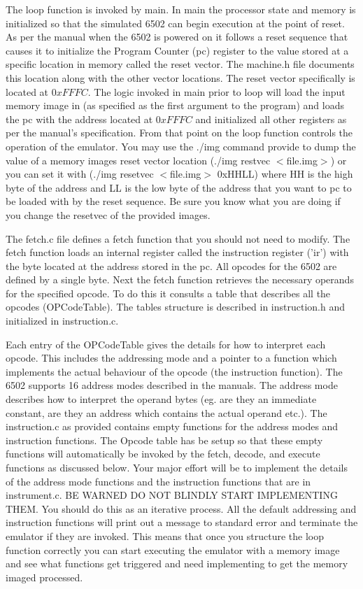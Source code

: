 \documentclass[11pt]{article}
\begin{document}
{The loop function is invoked by main.  In main the processor state and
memory is initialized so that the simulated 6502 can begin execution at
the point of reset.  As per the manual when the 6502 is powered on it
follows a reset sequence that causes it to initialize the Program
Counter (pc) register to the
value stored at a specific location in memory called the reset
vector.  The machine.h file documents this location along with the other vector
locations.  The reset vector specifically is located at $0xFFFC$.  The
logic invoked in main prior to loop will load the input memory image
in (as specified as the first argument to the program) and loads
the pc with the address located at $0xFFFC$ and initialized all other
registers as per the manual's specification.  From that point on the
loop function controls the operation of the emulator.  You may use the
./img command provide to dump the value of a memory images reset
vector location (./img restvec $<$file.img$>$) or you can set it with
(./img resetvec $<$file.img$>$ 0xHHLL) where HH is the high byte of the
address and LL is the low byte of the address that you want to pc to
be loaded with by the reset sequence.  Be sure you know what you are
doing if you change the resetvec of the provided images.

The fetch.c file defines a fetch function that you should not need to
modify.  The fetch function loads an internal
register called the instruction register ('ir') with the byte located
at the address stored in the pc.  All opcodes for the 6502 are defined
by a single byte.  Next the fetch function
retrieves the necessary operands for the specified opcode.  To do this
it consults a table that describes all the opcodes (OPCodeTable). The
tables structure is described in instruction.h and initialized in
instruction.c.  

Each entry of the OPCodeTable gives the details for how to interpret
each opcode.  This includes the addressing mode and a pointer to a
function which implements the actual behaviour of the opcode (the
instruction function). The 6502 supports 16 address modes described in
the manuals.  The address mode describes how to interpret the operand
bytes (eg. are they an immediate constant, are they an address which
contains the actual operand etc.).  The instruction.c as provided contains empty
functions for the address modes and instruction functions.  The Opcode
table has be setup so that these empty functions will automatically be
invoked by the fetch, decode, and execute functions as
discussed below.  Your major effort will be to implement the details
of the address mode functions and the instruction functions that are
in instrument.c.  BE WARNED DO NOT BLINDLY START IMPLEMENTING
THEM.  You should do this as an iterative process.  All the default
addressing and instruction functions will print out a message to
standard error and
terminate the emulator if they are invoked.  This means that once you
structure the loop function correctly you can start executing the
emulator with a memory image and see what functions get triggered and
need implementing to get the memory imaged processed. 

}
\end{document}
